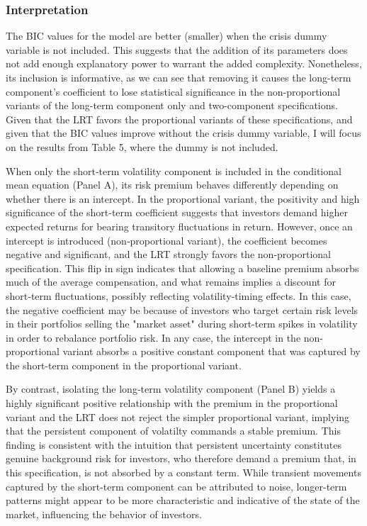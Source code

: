 \documentclass[12pt]{article}
\begin{document}
\subsubsection{Interpretation}
The BIC values for the model are better (smaller) when the crisis dummy variable is not included. This suggests that the addition of its parameters does not add enough explanatory power to warrant the added complexity. Nonetheless, its inclusion is informative, as we can see that removing it causes the long-term component's coefficient to lose statistical significance in the non-proportional variants of the long-term component only and two-component specifications. Given that the LRT favors the proportional variants of these specifications, and given that the BIC values improve without the crisis dummy variable, I will focus on the results from Table 5, where the dummy is not included.\par
When only the short‐term volatility component is included in the conditional mean equation (Panel A), its risk premium behaves differently depending on whether there is an intercept. In the proportional variant, the positivity and high significance of the short-term coefficient suggests that investors demand higher expected returns for bearing transitory fluctuations in return. However, once an intercept is introduced (non‑proportional variant), the coefficient becomes negative and significant, and the LRT strongly favors the non‑proportional specification. This flip in sign indicates that allowing a baseline premium absorbs much of the average compensation, and what remains implies a discount for short‐term fluctuations, possibly reflecting volatility‐timing effects. In this case, the negative coefficient may be because of investors who target certain risk levels in their portfolios selling the "market asset" during short-term spikes in volatility in order to rebalance portfolio risk. In any case, the intercept in the non-proportional variant absorbs a positive constant component that was captured by the short-term component in the proportional variant.\par
By contrast, isolating the long‑term volatility component (Panel B) yields a highly significant positive relationship with the premium in the proportional variant and the LRT does not reject the simpler proportional variant, implying that the persistent component of volatilty commands a stable premium. This finding is consistent with the intuition that persistent uncertainty constitutes genuine background risk for investors, who therefore demand a premium that, in this specification, is not absorbed by a constant term. While transient movements captured by the short-term component can be attributed to noise, longer-term patterns might appear to be more characteristic and indicative of the state of the market, influencing the behavior of investors.\par
\end{document}
